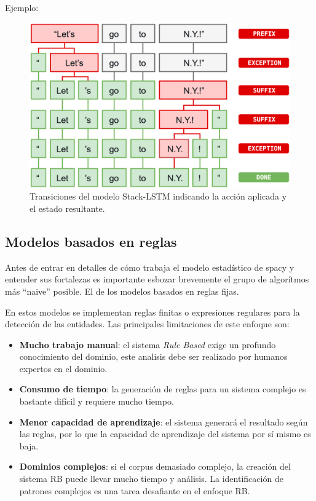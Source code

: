 \documentclass[12pt,a4paper,]{scrartcl}
\providecommand{\tightlist}{%
  \setlength{\itemsep}{0pt}\setlength{\parskip}{0pt}}
\begin{document}
Ejemplo:

\begin{figure}[H]

{\centering \includegraphics{assets/spacy_tokenization.pdf} 

}

\caption{Transiciones del modelo Stack-LSTM indicando la acción aplicada y el estado resultante.}\label{fig:spacy-tokenization}
\end{figure}

\hypertarget{modelos-basados-en-reglas}{%
\subsection{Modelos basados en reglas}\label{modelos-basados-en-reglas}}

Antes de entrar en detalles de cómo trabaja el modelo estadístico de spacy y entender sus fortalezas es importante esbozar brevemente el grupo de algorítmos más \enquote{naive} posible. El de los modelos basados en reglas fijas.

En estos modelos se implementan reglas finitas o expresiones regulares para la detección de las entidades. Las principales limitaciones de este enfoque son:

\begin{itemize}
\tightlist
\item
  \textbf{Mucho trabajo manua}l: el sistema \emph{Rule Based} exige un profundo conocimiento del dominio, este analisis debe ser realizado por humanos expertos en el dominio.
\item
  \textbf{Consumo de tiempo}: la generación de reglas para un sistema complejo es bastante difícil y requiere mucho tiempo.
\item
  \textbf{Menor capacidad de aprendizaje}: el sistema generará el resultado según las reglas, por lo que la capacidad de aprendizaje del sistema por sí mismo es baja.
\item
  \textbf{Dominios complejos}: si el corpus demasiado complejo, la creación del sistema RB puede llevar mucho tiempo y análisis. La identificación de patrones complejos es una tarea desafiante en el enfoque RB.
\end{itemize}
\end{document}
